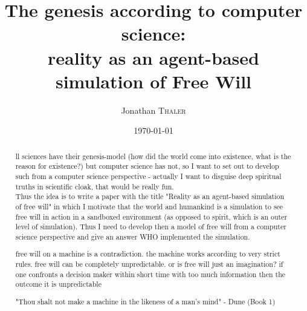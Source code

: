 \documentclass{article}
\title{The genesis according to computer science:\\reality as an agent-based simulation of Free Will} %
\author{Jonathan \textsc{Thaler}} %
\date{\today} %
\begin{document}
\maketitle %

\begin{abstract}
ll sciences have their genesis-model (how did the world come into existence, what is the reason for existence?) but computer science has not, so I want to set out to develop such from a computer science perspective - actually I want to disguise deep spiritual truths in scientific cloak, that would be really fun. \\
Thus the idea is to write a paper with the title "Reality as an agent-based simulation of free will" in which I motivate that the world and humankind is a simulation to see free will in action in a sandboxed environment (as opposed to spirit, which is an outer level of simulation). Thus I need to develop then a model of free will from a computer science perspective and give an answer WHO implemented the simulation.

free will on a machine is a contradiction. the machine works according to very strict rules. free will can be completely unpredictable. or is free will just an imagination? if one confronts a decision maker within short time with too much information then the outcome it is unpredictable 

\bigskip

"Thou shalt not make a machine in the likeness of a man's mind" - Dune (Book 1)
\end{abstract}
\end{document}
